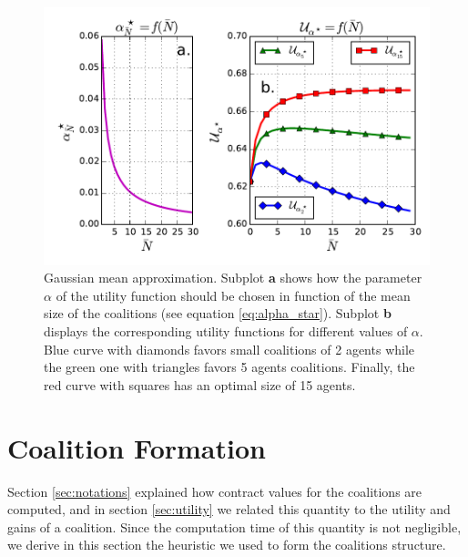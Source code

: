 \documentclass[journal]{IEEEtran}
\begin{document}
\begin{figure}
\includegraphics[scale=.48]{./figs/figure_2}
\caption{{\footnotesize Gaussian mean approximation. Subplot \textbf{a} shows how the parameter $ \alpha $ of the utility function should be chosen in function of the mean size of the coalitions (see equation \ref{eq:alpha_star}). Subplot \textbf{b} displays the corresponding utility functions for different values of $ \alpha $. Blue curve with diamonds favors small coalitions of 2 agents while the green one with triangles favors 5 agents coalitions. Finally, the red curve with squares has an optimal size of 15 agents.} }
\label{fig:mean_approx}
\end{figure}

%
%
\section{Coalition Formation}
\label{sec:forming}
Section \ref{sec:notations} explained how contract values for the coalitions are computed, and in section \ref{sec:utility} we related this quantity to the utility and gains of a coalition. Since the computation time of this quantity is not negligible, we derive in this section the heuristic we used to form the coalitions structure. 
\end{document}
